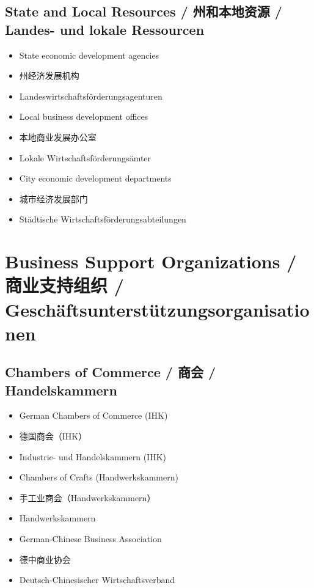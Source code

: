 \subsection{State and Local Resources / 州和本地资源 / Landes- und lokale Ressourcen}
\begin{itemize}
    \item State economic development agencies
    \item 州经济发展机构
    \item Landeswirtschaftsförderungsagenturen
    \item Local business development offices
    \item 本地商业发展办公室
    \item Lokale Wirtschaftsförderungsämter
    \item City economic development departments
    \item 城市经济发展部门
    \item Städtische Wirtschaftsförderungsabteilungen
\end{itemize}

\section{Business Support Organizations / 商业支持组织 / Geschäftsunterstützungsorganisationen}

\subsection{Chambers of Commerce / 商会 / Handelskammern}
\begin{itemize}
    \item German Chambers of Commerce (IHK)
    \item 德国商会（IHK）
    \item Industrie- und Handelskammern (IHK)
    \item Chambers of Crafts (Handwerkskammern)
    \item 手工业商会（Handwerkskammern）
    \item Handwerkskammern
    \item German-Chinese Business Association
    \item 德中商业协会
    \item Deutsch-Chinesischer Wirtschaftsverband
\end{itemize}

